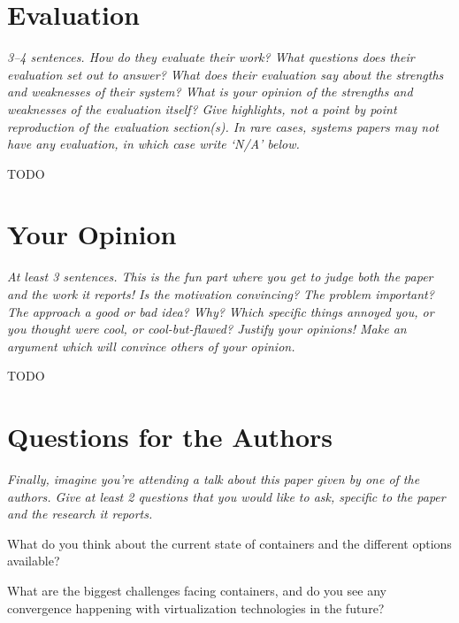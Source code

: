 \documentclass[11pt]{article}
\begin{document}
\section*{Evaluation}

\textsl{3--4 sentences. How do they evaluate their work? What questions does
their evaluation set out to answer? What does their evaluation say about the
strengths and weaknesses of their system? What is your opinion of the strengths
and weaknesses of the evaluation itself? Give highlights, not a point by point
reproduction of the evaluation section(s). In rare cases, systems papers may
not have any evaluation, in which case write `N/A' below.}

TODO

\section*{Your Opinion}

\textsl{At least 3 sentences. This is the fun part where you get to judge both
the paper and the work it reports! Is the motivation convincing? The problem
important? The approach a good or bad idea? Why? Which specific things annoyed
you, or you thought were cool, or cool-but-flawed? Justify your opinions! Make
an argument which will convince others of your opinion.}

TODO

\section*{Questions for the Authors}

\textsl{Finally, imagine you're attending a talk about this paper given by one
of the authors. Give at least 2 questions that you would like to ask, specific
to the paper and the research it reports.}

What do you think about the current state of containers and the different
options available?

What are the biggest challenges facing containers, and do you see any
convergence happening with virtualization technologies in the future?




\end{document}
